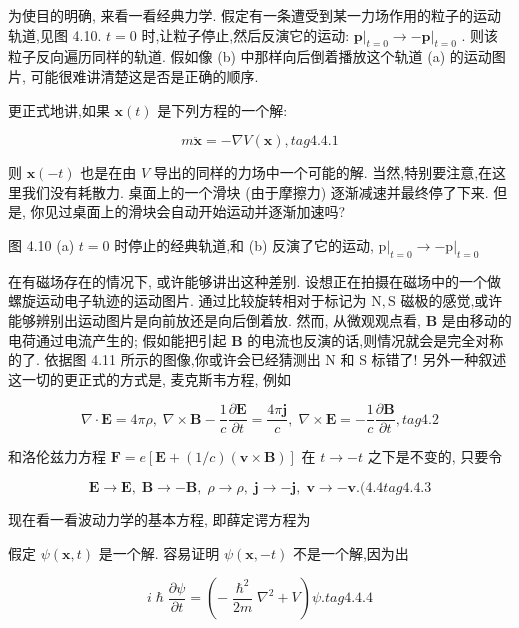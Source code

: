 为使目的明确, 来看一看经典力学. 假定有一条遭受到某一力场作用的粒子的运动轨道,见图 4.10. $t = 0$ 时,让粒子停止,然后反演它的运动: ${\left. \mathbf{p}\right| }_{t = 0} \rightarrow - {\left. \mathbf{p}\right| }_{t = 0}$ . 则该粒子反向遍历同样的轨道. 假如像 (b) 中那样向后倒着播放这个轨道 (a) 的运动图片, 可能很难讲清楚这是否是正确的顺序.

更正式地讲,如果 $\mathbf{x}\left( t\right)$ 是下列方程的一个解:

$$
m\ddot{\mathbf{x}} = - \nabla V\left( \mathbf{x}\right) , tag{4. 4.1}
$$

则 $\mathbf{x}\left( {-t}\right)$ 也是在由 $V$ 导出的同样的力场中一个可能的解. 当然,特别要注意,在这里我们没有耗散力. 桌面上的一个滑块 (由于摩擦力) 逐渐减速并最终停了下来. 但是, 你见过桌面上的滑块会自动开始运动并逐渐加速吗?


图 4.10 (a) $t = 0$ 时停止的经典轨道,和 (b) 反演了它的运动, ${\left. \mathrm{p}\right| }_{t = 0} \rightarrow - {\left. \mathrm{p}\right| }_{t = 0}$

在有磁场存在的情况下, 或许能够讲出这种差别. 设想正在拍摄在磁场中的一个做螺旋运动电子轨迹的运动图片. 通过比较旋转相对于标记为 $\mathrm{N},\mathrm{S}$ 磁极的感觉,或许能够辨别出运动图片是向前放还是向后倒着放. 然而, 从微观观点看, $\mathbf{B}$ 是由移动的电荷通过电流产生的; 假如能把引起 $\mathbf{B}$ 的电流也反演的话,则情况就会是完全对称的了. 依据图 4.11 所示的图像,你或许会已经猜测出 $\mathrm{N}$ 和 $\mathrm{S}$ 标错了! 另外一种叙述这一切的更正式的方式是, 麦克斯韦方程, 例如

$$
\nabla \cdot \mathbf{E} = {4\pi \rho },\;\nabla \times \mathbf{B} - \frac{1}{c}\frac{\partial \mathbf{E}}{\partial t} = \frac{{4\pi }\mathbf{j}}{c},\;\nabla \times \mathbf{E} = - \frac{1}{c}\frac{\partial \mathbf{B}}{\partial t}, tag{4.2}
$$

和洛伦兹力方程 $\mathbf{F} = e\left\lbrack {\mathbf{E} + \left( {1/c}\right) \left( {\mathbf{v} \times \mathbf{B}}\right) }\right\rbrack$ 在 $t \rightarrow - t$ 之下是不变的, 只要令

$$
\mathbf{E} \rightarrow \mathbf{E},\;\mathbf{B} \rightarrow - \mathbf{B},\;\rho \rightarrow \rho ,\;\mathbf{j} \rightarrow - \mathbf{j},\;\mathbf{v} \rightarrow - \mathbf{v}.({4.4} tag{4. 4.3}
$$

现在看一看波动力学的基本方程, 即薛定谔方程为

假定 $\psi \left( {\mathbf{x}, t}\right)$ 是一个解. 容易证明 $\psi \left( {\mathbf{x}, - t}\right)$ 不是一个解,因为出

$$
i\hslash \frac{\partial \psi }{\partial t} = \left( {-\frac{{\hslash }^{2}}{2m}{\nabla }^{2} + V}\right) \psi . tag{4.4.4}
$$

